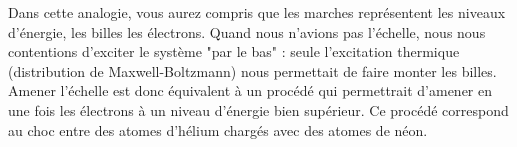 Dans cette analogie, vous aurez compris que les marches représentent les niveaux d'énergie, les billes les électrons. Quand nous n'avions pas l'échelle, nous nous contentions d'exciter le système "par le bas" : seule l'excitation thermique (distribution de Maxwell-Boltzmann) nous permettait de faire monter les billes. Amener l'échelle est donc équivalent à un procédé qui permettrait d'amener en une fois les électrons à un niveau d'énergie bien supérieur. Ce procédé correspond au choc entre des atomes d'hélium chargés avec des atomes de néon.\\

